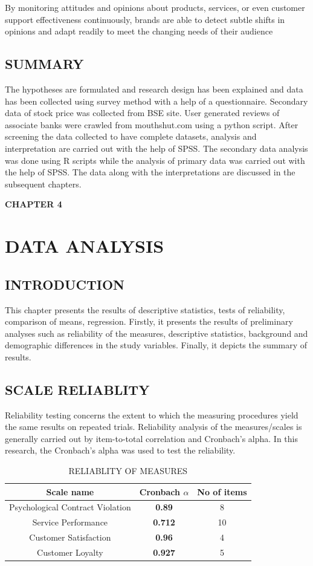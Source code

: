 \documentclass[a4paper, 12pt]{extarticle}
\begin{document}
{By monitoring attitudes and opinions about products, services, or even customer support effectiveness continuously, brands are able to detect subtle shifts in opinions and adapt readily to meet the changing needs of their audience
\newpage
\subsection{SUMMARY}
The hypotheses are formulated and research design has been explained and data has been collected using survey method with a help of a questionnaire. Secondary data of stock price was collected from BSE site. User generated reviews of associate banks were crawled from mouthshut.com using a python script. After screening the data collected to have complete datasets, analysis and interpretation are carried out with the help of SPSS. The secondary data analysis was done using R scripts while the analysis of primary data was carried out with the help of SPSS. The data along with the interpretations are discussed in the subsequent chapters.

\newpage
\begin{center}
\textbf{\large CHAPTER 4}
\end{center}
\section{DATA ANALYSIS}
\subsection{INTRODUCTION}
This chapter presents the results of descriptive statistics, tests of reliability, comparison of means, regression. Firstly, it presents the results of preliminary analyses such as reliability of the measures, descriptive statistics, background and demographic differences in the study variables. Finally, it depicts the summary of results.

\subsection{SCALE RELIABLITY}
Reliability testing concerns the extent to which the measuring procedures yield the same results on repeated trials. Reliability analysis of the measures/scales is generally carried out by item-to-total correlation and Cronbach's alpha. In this research, the Cronbach's  alpha was used to test the reliability.
\begin{table}[H]
\centering
\begin{tabular}{|c|c|c|}
\hline
\textbf{Scale name} & \textbf{Cronbach $\alpha$} & \textbf{No of items}\\
\hline
Psychological Contract Violation & \textbf{0.89} & 8\\
\hline
Service Performance & \textbf{0.712} & 10\\
\hline
Customer Satisfaction & \textbf{0.96} & 4\\
\hline
Customer Loyalty & \textbf{0.927} & 5 \\
\hline
\end{tabular}
\caption{RELIABLITY OF MEASURES}
\end{table}

}
\end{document}
